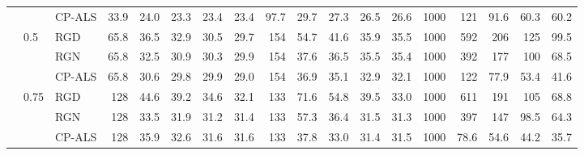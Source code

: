 \begin{table}[!htbp]
{\begin{tabular}{lll*{15}{r}}
 &  & CP-ALS & 33.9 & 24.0 & 23.3 & 23.4 & 23.4 & 97.7 & 29.7 & 27.3 & 26.5 & 26.6 & 1000 & 121 & 91.6 & 60.3 & 60.2 \\
\addlinespace
 & 0.5 & RGD & 65.8 & 36.5 & 32.9 & 30.5 & 29.7 & 154 & 54.7 & 41.6 & 35.9 & 35.5 & 1000 & 592 & 206 & 125 & 99.5 \\
 &  & RGN & 65.8 & 32.5 & 30.9 & 30.3 & 29.9 & 154 & 37.6 & 36.5 & 35.5 & 35.4 & 1000 & 392 & 177 & 100 & 68.5 \\
 &  & CP-ALS & 65.8 & 30.6 & 29.8 & 29.9 & 29.0 & 154 & 36.9 & 35.1 & 32.9 & 32.1 & 1000 & 122 & 77.9 & 53.4 & 41.6 \\
\addlinespace
 & 0.75 & RGD & 128 & 44.6 & 39.2 & 34.6 & 32.1 & 133 & 71.6 & 54.8 & 39.5 & 33.0 & 1000 & 611 & 191 & 105 & 68.8 \\
 &  & RGN & 128 & 33.5 & 31.9 & 31.2 & 31.4 & 133 & 57.3 & 36.4 & 31.5 & 31.3 & 1000 & 397 & 147 & 98.5 & 64.3 \\
 &  & CP-ALS & 128 & 35.9 & 32.6 & 31.6 & 31.6 & 133 & 37.8 & 33.0 & 31.4 & 31.5 & 1000 & 78.6 & 54.6 & 44.2 & 35.7 \\
\bottomrule
\end{tabular}}
\end{table}

